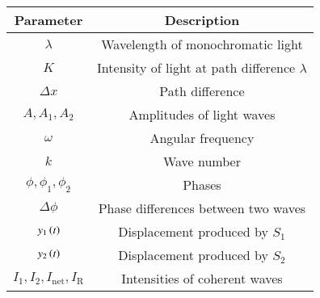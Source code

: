 \begin{tabular}{|c|c|}
\hline 
   \textbf{Parameter}  &\textbf{Description} \\
\hline
     $\lambda$ & Wavelength of monochromatic light\\
\hline
$K$ & Intensity of light at path difference $\lambda$ \\
\hline
$\Delta x$ & Path difference \\
\hline
$A,A_1,A_2$ & Amplitudes of light waves \\
\hline
$\omega$ & Angular frequency \\
\hline
$k$ & Wave number \\ 
\hline
$\phi, \phi_1,\phi_2$ & Phases  \\
\hline
$\Delta \phi $ & Phase differences between two waves \\
\hline
$y_1\left(t\right)$ & Displacement produced by $S_1$ \\
\hline
$y_2\left(t\right)$ & Displacement produced by $S_2$ \\
\hline
$I_1,I_2,I_{\text{net}},I_{\text{R}}$ & Intensities of coherent waves \\
\hline
\end{tabular}
